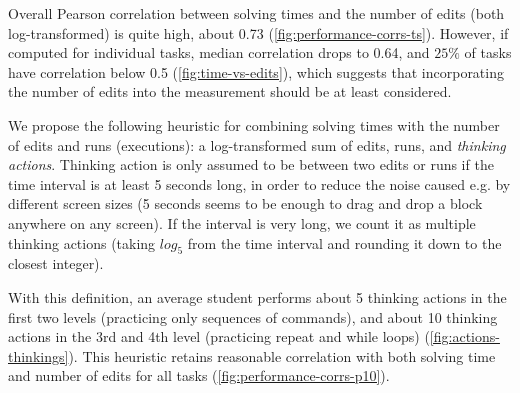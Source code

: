 Overall Pearson correlation between solving times and the number of edits (both
log-transformed) is quite high, about 0.73 (\cref{fig:performance-corrs-ts}).
However, if computed for individual tasks,
median correlation drops to 0.64, %
and $25\%$ of tasks have correlation below 0.5 %
(\cref{fig:time-vs-edits}), which suggests that incorporating the number of edits into the
measurement should be at least considered.

We propose the following heuristic for combining solving times with the number
of edits and runs (executions): a log-transformed sum of edits, runs, and \emph{thinking
actions}.
Thinking action is only assumed to be between two edits or runs if the time interval
is at least 5 seconds long, in order to reduce the noise caused e.g. by
different screen sizes
(5 seconds seems to be enough to drag and drop a block anywhere on any screen).
If the interval is very long,
we count it as multiple thinking actions (taking $log_5$ from the time interval
and rounding it down to the closest integer).

With this definition, an average student performs about 5 thinking actions
in the first two levels (practicing only sequences of commands),
and about 10 thinking actions in the 3rd and 4th level (practicing repeat and while loops)
(\cref{fig:actions-thinkings}).
This heuristic retains reasonable correlation with both solving time
and number of edits for all tasks (\cref{fig:performance-corrs-p10}).



